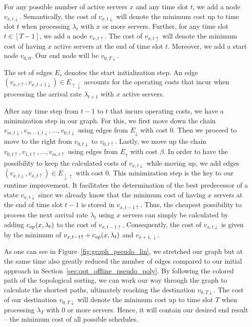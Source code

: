 For any possible number of active servers $x$ and any time slot $t$, we add a node $v_{x,t\downarrow}$. Semantically, the cost of $v_{x,t\downarrow}$ will denote the minimum cost up to time slot $t$ when processing $\lambda_t$ with $x$ or more servers. Further, for any time slot $t\in[T-1]$, we add a node $v_{x,t\uparrow}$. The cost of $v_{x,t\uparrow}$ will denote the minimum cost of having $x$ active servers at the end of time slot $t$. Moreover, we add a start node $v_{0,0}$. Our end node will be $v_{0,T\downarrow}$.

The set of edges $E_s$ denotes the start initialization step. An edge $(v_{x,t\uparrow},v_{x,t+1\downarrow})\in E_{\uparrow\downarrow}$ accounts for the operating costs that incur when processing the arrival rate $\lambda_{t+1}$ with $x$ active servers.

After any time step from $t-1$ to $t$ that incurs operating costs, we have a minimization step in our graph. For this, we first move down the chain $v_{m,t\downarrow},v_{m-1,t\downarrow},\ldots,v_{0,t\downarrow}$ using edges from $E_\downarrow$ with cost $0$. Then we proceed to move to the right from $v_{0,t\downarrow}$ to $v_{0,t\uparrow}$. Lastly, we move up the chain $v_{0,t\uparrow},v_{1,t\uparrow},\ldots,v_{m,t\uparrow}$ using edges from $E_\uparrow$ with cost $\beta$. In order to have the possibility to keep the calculated costs of $v_{x,t\downarrow}$ while moving up, we add edges $(v_{x,t\downarrow},v_{x,t\uparrow})\in E_{\downarrow\uparrow}$ with cost $0$.  
This minimization step is the key to our runtime improvement. It facilitates the determination of the best predecessor of a state $v_{x,t\downarrow}$ since we already know that the minimum cost of having $x$ servers at the end of time slot $t-1$ is stored in $v_{x,t-1\uparrow}$. Thus, the cheapest possibility to process the next arrival rate $\lambda_t$ using $x$ servers can simply be calculated by adding $c_{op}(x,\lambda_t)$ to the cost of $v_{x,t-1\uparrow}$. Consequently, the cost of $v_{x,t\downarrow}$ is given by the minimum of $v_{x,t-1\uparrow}+c_{op}(x,\lambda_t)$ and $v_{x+1,\downarrow}$.

As one can see in Figure~\ref{fig:graph_pseudo_lin}, we stretched our graph but at the same time also greatly reduced the number of edges compared to our initial approach in Section~\ref{sec:opt_offline_pseudo_poly}. By following the colored path of the topological sorting, we can work our way through the graph to calculate the shortest paths, ultimately reaching the destination $v_{0,T\downarrow}$. The cost of our destination $v_{0,T\downarrow}$ will denote the minimum cost up to time slot $T$ when processing $\lambda_T$ with 0 or more servers. Hence, it will contain our desired end result -- the minimum cost of all possible schedules.

